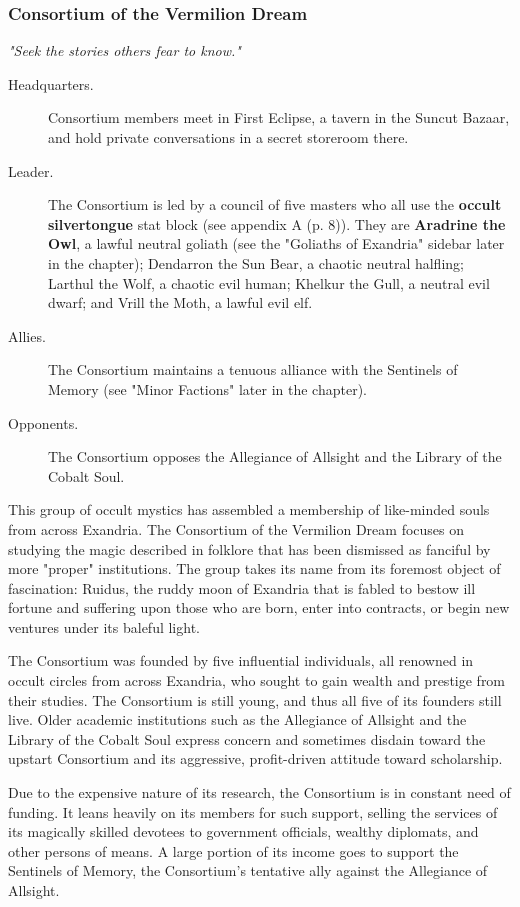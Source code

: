 \documentclass[letterpaper, 11pt, bg=full, twocolumn]{dndbook}
\begin{document}
\subsubsection{Consortium of the Vermilion Dream}

\textit{"Seek the stories others fear to know."}

\begin{description}
\item[Headquarters.] Consortium members meet in First Eclipse, a tavern in the Suncut Bazaar, and hold private conversations in a secret storeroom there.
\item[Leader.] The Consortium is led by a council of five masters who all use the \textbf{occult silvertongue} stat block (see appendix A (p. 8)). They are \textbf{Aradrine the Owl}, a lawful neutral goliath (see the "Goliaths of Exandria" sidebar later in the chapter); Dendarron the Sun Bear, a chaotic neutral halfling; Larthul the Wolf, a chaotic evil human; Khelkur the Gull, a neutral evil dwarf; and Vrill the Moth, a lawful evil elf.
\item[Allies.] The Consortium maintains a tenuous alliance with the Sentinels of Memory (see "Minor Factions" later in the chapter).
\item[Opponents.] The Consortium opposes the Allegiance of Allsight and the Library of the Cobalt Soul.
\end{description}

This group of occult mystics has assembled a membership of like-minded souls from across Exandria. The Consortium of the Vermilion Dream focuses on studying the magic described in folklore that has been dismissed as fanciful by more "proper" institutions. The group takes its name from its foremost object of fascination: Ruidus, the ruddy moon of Exandria that is fabled to bestow ill fortune and suffering upon those who are born, enter into contracts, or begin new ventures under its baleful light.

The Consortium was founded by five influential individuals, all renowned in occult circles from across Exandria, who sought to gain wealth and prestige from their studies. The Consortium is still young, and thus all five of its founders still live. Older academic institutions such as the Allegiance of Allsight and the Library of the Cobalt Soul express concern and sometimes disdain toward the upstart Consortium and its aggressive, profit-driven attitude toward scholarship.

Due to the expensive nature of its research, the Consortium is in constant need of funding. It leans heavily on its members for such support, selling the services of its magically skilled devotees to government officials, wealthy diplomats, and other persons of means. A large portion of its income goes to support the Sentinels of Memory, the Consortium's tentative ally against the Allegiance of Allsight.
\end{document}
